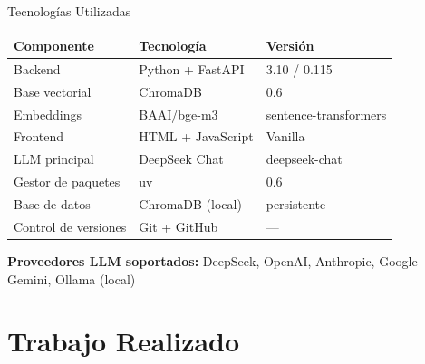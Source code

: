 \documentclass[aspectratio=169, 11pt]{beamer}
\begin{document}
\begin{frame}{Tecnologías Utilizadas}
\begin{table}
\centering
\small
\begin{tabular}{lll}
\toprule
\textbf{Componente} & \textbf{Tecnología} & \textbf{Versión} \\
\midrule
Backend & Python + FastAPI & 3.10 / 0.115 \\
Base vectorial & ChromaDB & 0.6 \\
Embeddings & BAAI/bge-m3 & sentence-transformers \\
Frontend & HTML + JavaScript & Vanilla \\
LLM principal & DeepSeek Chat & deepseek-chat \\
Gestor de paquetes & uv & 0.6 \\
Base de datos & ChromaDB (local) & persistente \\
Control de versiones & Git + GitHub & --- \\
\bottomrule
\end{tabular}
\end{table}

\vspace{0.3cm}
\textbf{Proveedores LLM soportados:} DeepSeek, OpenAI, Anthropic, Google Gemini, Ollama (local)
\end{frame}

\section{Trabajo Realizado}
\end{document}
